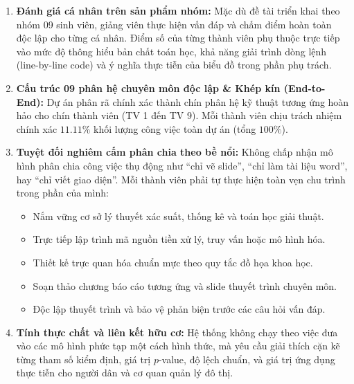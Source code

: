 \documentclass[11pt,a4paper]{article}
\begin{document}
\begin{tcolorbox}[colback=red!5!white, colframe=red!60!black, fonttitle=\bfseries\color{white}, title={QUY TẮC ĐÁNH GIÁ VÀ BẢO VỆ ĐỒ ÁN (CHỈ ĐẠO TỪ GIẢNG VIÊN)}]
\begin{enumerate}[leftmargin=*]
    \item \textbf{Đánh giá cá nhân trên sản phẩm nhóm:} Mặc dù đề tài triển khai theo nhóm 09 sinh viên, giảng viên thực hiện vấn đáp và chấm điểm hoàn toàn độc lập cho từng cá nhân. Điểm số của từng thành viên phụ thuộc trực tiếp vào mức độ thông hiểu bản chất toán học, khả năng giải trình dòng lệnh (line-by-line code) và ý nghĩa thực tiễn của biểu đồ trong phần phụ trách.
    \item \textbf{Cấu trúc 09 phân hệ chuyên môn độc lập \& Khép kín (End-to-End):} Dự án phân rã chính xác thành chín phân hệ kỹ thuật tương ứng hoàn hảo cho chín thành viên (TV 1 đến TV 9). Mỗi thành viên chịu trách nhiệm chính xác $11.11\%$ khối lượng công việc toàn dự án (tổng $100\%$).
    \item \textbf{Tuyệt đối nghiêm cấm phân chia theo bề nổi:} Không chấp nhận mô hình phân chia công việc thụ động như “chỉ vẽ slide”, “chỉ làm tài liệu word”, hay “chỉ viết giao diện”. Mỗi thành viên phải tự thực hiện toàn vẹn chu trình trong phần của mình:
    \begin{itemize}
        \item Nắm vững cơ sở lý thuyết xác suất, thống kê và toán học giải thuật.
        \item Trực tiếp lập trình mã nguồn tiền xử lý, truy vấn hoặc mô hình hóa.
        \item Thiết kế trực quan hóa chuẩn mực theo quy tắc đồ họa khoa học.
        \item Soạn thảo chương báo cáo tương ứng và slide thuyết trình chuyên môn.
        \item Độc lập thuyết trình và bảo vệ phản biện trước các câu hỏi vấn đáp.
    \end{itemize}
    \item \textbf{Tính thực chất và liên kết hữu cơ:} Hệ thống không chạy theo việc đưa vào các mô hình phức tạp một cách hình thức, mà yêu cầu giải thích cặn kẽ từng tham số kiểm định, giá trị $p$-value, độ lệch chuẩn, và giá trị ứng dụng thực tiễn cho người dân và cơ quan quản lý đô thị.
\end{enumerate}
\end{tcolorbox}

\end{document}
